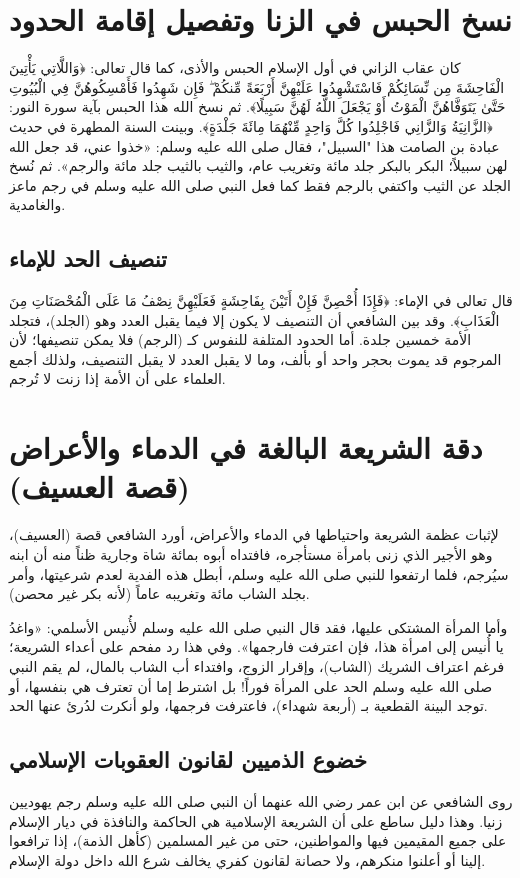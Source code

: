 \section{نسخ الحبس في الزنا وتفصيل إقامة الحدود}
كان عقاب الزاني في أول الإسلام الحبس والأذى، كما قال تعالى: ﴿وَاللَّاتِي يَأْتِينَ الْفَاحِشَةَ مِن نِّسَائِكُمْ فَاسْتَشْهِدُوا عَلَيْهِنَّ أَرْبَعَةً مِّنكُمْ ۖ فَإِن شَهِدُوا فَأَمْسِكُوهُنَّ فِي الْبُيُوتِ حَتَّىٰ يَتَوَفَّاهُنَّ الْمَوْتُ أَوْ يَجْعَلَ اللَّهُ لَهُنَّ سَبِيلًا﴾. 
ثم نسخ الله هذا الحبس بآية سورة النور: ﴿الزَّانِيَةُ وَالزَّانِي فَاجْلِدُوا كُلَّ وَاحِدٍ مِّنْهُمَا مِائَةَ جَلْدَةٍ﴾. 
وبينت السنة المطهرة في حديث عبادة بن الصامت هذا "السبيل"، فقال صلى الله عليه وسلم: «خذوا عني، قد جعل الله لهن سبيلاً؛ البكر بالبكر جلد مائة وتغريب عام، والثيب بالثيب جلد مائة والرجم». ثم نُسخ الجلد عن الثيب واكتفي بالرجم فقط كما فعل النبي صلى الله عليه وسلم في رجم ماعز والغامدية.

\subsection{تنصيف الحد للإماء}
قال تعالى في الإماء: ﴿فَإِذَا أُحْصِنَّ فَإِنْ أَتَيْنَ بِفَاحِشَةٍ فَعَلَيْهِنَّ نِصْفُ مَا عَلَى الْمُحْصَنَاتِ مِنَ الْعَذَابِ﴾. 
وقد بين الشافعي أن التنصيف لا يكون إلا فيما يقبل العدد وهو (الجلد)، فتجلد الأمة خمسين جلدة. أما الحدود المتلفة للنفوس كـ (الرجم) فلا يمكن تنصيفها؛ لأن المرجوم قد يموت بحجر واحد أو بألف، وما لا يقبل العدد لا يقبل التنصيف، ولذلك أجمع العلماء على أن الأمة إذا زنت لا تُرجم.

\section{دقة الشريعة البالغة في الدماء والأعراض (قصة العسيف)}
لإثبات عظمة الشريعة واحتياطها في الدماء والأعراض، أورد الشافعي قصة (العسيف)، وهو الأجير الذي زنى بامرأة مستأجره، فافتداه أبوه بمائة شاة وجارية ظناً منه أن ابنه سيُرجم، فلما ارتفعوا للنبي صلى الله عليه وسلم، أبطل هذه الفدية لعدم شرعيتها، وأمر بجلد الشاب مائة وتغريبه عاماً (لأنه بكر غير محصن). 

وأما المرأة المشتكى عليها، فقد قال النبي صلى الله عليه وسلم لأُنيس الأسلمي: «واغدُ يا أُنيس إلى امرأة هذا، فإن اعترفت فارجمها». وفي هذا رد مفحم على أعداء الشريعة؛ فرغم اعتراف الشريك (الشاب)، وإقرار الزوج، وافتداء أب الشاب بالمال، لم يقم النبي صلى الله عليه وسلم الحد على المرأة فوراً! بل اشترط إما أن تعترف هي بنفسها، أو توجد البينة القطعية بـ (أربعة شهداء)، فاعترفت فرجمها، ولو أنكرت لدُرئ عنها الحد.

\subsection{خضوع الذميين لقانون العقوبات الإسلامي}
روى الشافعي عن ابن عمر رضي الله عنهما أن النبي صلى الله عليه وسلم رجم يهوديين زنيا. وهذا دليل ساطع على أن الشريعة الإسلامية هي الحاكمة والنافذة في ديار الإسلام على جميع المقيمين فيها والمواطنين، حتى من غير المسلمين (كأهل الذمة)، إذا ترافعوا إلينا أو أعلنوا منكرهم، ولا حصانة لقانون كفري يخالف شرع الله داخل دولة الإسلام.

